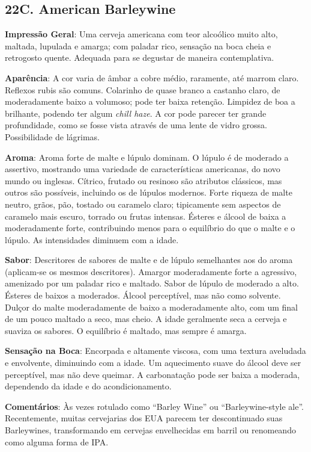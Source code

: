 \subsection*{22C. American Barleywine}

\textbf{Impressão Geral}: Uma cerveja americana com teor alcoólico muito alto, maltada, lupulada e amarga; com paladar rico, sensação na boca cheia e retrogosto quente. Adequada para se degustar de maneira contemplativa.

\textbf{Aparência}: A cor varia de âmbar a cobre médio, raramente, até marrom claro. Reflexos rubis são comuns. Colarinho de quase branco a castanho claro, de moderadamente baixo a volumoso; pode ter baixa retenção. Limpidez de boa a brilhante, podendo ter algum \textit{chill haze}. A cor pode parecer ter grande profundidade, como se fosse vista através de uma lente de vidro grossa. Possibilidade de lágrimas.

\textbf{Aroma}: Aroma forte de malte e lúpulo dominam. O lúpulo é de moderado a assertivo, mostrando uma variedade de características americanas, do novo mundo ou inglesas. Cítrico, frutado ou resinoso são atributos clássicos, mas outros são possíveis, incluindo os de lúpulos modernos. Forte riqueza de malte neutro, grãos, pão, tostado ou caramelo claro; tipicamente sem aspectos de caramelo mais escuro, torrado ou frutas intensas. Ésteres e álcool de baixa a moderadamente forte, contribuindo menos para o equilíbrio do que o malte e o lúpulo. As intensidades diminuem com a idade.

\textbf{Sabor}: Descritores de sabores de malte e de lúpulo semelhantes aos do aroma (aplicam-se os mesmos descritores). Amargor moderadamente forte a agressivo, amenizado por um paladar rico e maltado. Sabor de lúpulo de moderado a alto. Ésteres de baixos a moderados. Álcool perceptível, mas não como solvente. Dulçor do malte moderadamente de baixo a moderadamente alto, com um final de um pouco maltado a seco, mas cheio. A idade geralmente seca a cerveja e suaviza os sabores. O equilíbrio é maltado, mas sempre é amarga.

\textbf{Sensação na Boca}: Encorpada e altamente viscosa, com uma textura aveludada e envolvente, diminuindo com a idade. Um aquecimento suave do álcool deve ser perceptível, mas não deve queimar. A carbonatação pode ser baixa a moderada, dependendo da idade e do acondicionamento.

\textbf{Comentários}: Às vezes rotulado como “Barley Wine” ou “Barleywine-style ale”. Recentemente, muitas cervejarias dos EUA parecem ter descontinuado suas Barleywines, transformando em cervejas envelhecidas em barril ou renomeando como alguma forma de IPA.


